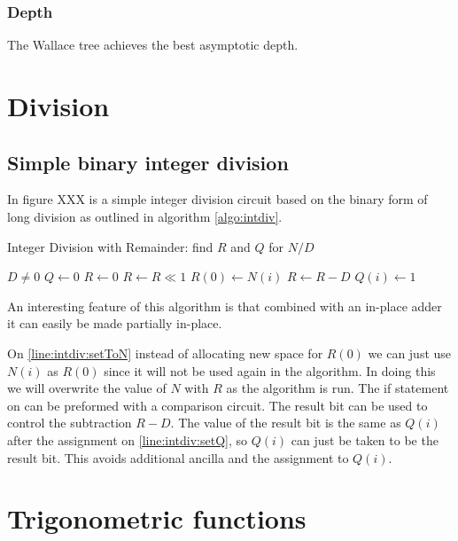     \subsubsection{Depth}
      The Wallace tree achieves the best asymptotic depth.

\section{Division}
  \subsection{Simple binary integer division}
    In figure XXX is a simple integer division circuit based on the binary form of long division as outlined in algorithm \ref{algo:intdiv}.
    \begin{program}
      \capstart
      \caption{Integer Division with Remainder: find $R$ and $Q$ for $N/D$}
      \begin{algorithmic}[1]
        \Require $D \neq 0$
        \State $Q \gets 0$              
        \State $R \gets 0$                 
          \State $R \gets R \ll 1$  
          \State $R(0) \gets N(i)$ \label{line:intdiv:setToN} 
           \label{line:intdiv:compare}
            \State $R\gets R - D$               
            \State $Q(i) \gets 1$ \label{line:intdiv:setQ}

          \EndIf
        \EndFor 
      \end{algorithmic}
      \label{algo:intdiv}
    \end{program}
    An interesting feature of this algorithm is that combined with an in-place adder\cite{CDKM:2004} it can easily be made partially in-place.

    On \cref{line:intdiv:setToN} instead of allocating new space for $R(0)$ we can just use $N(i)$ as $R(0)$ since it will not be used again in the algorithm. 
    In doing this we will overwrite the value of $N$ with $R$ as the algorithm is run.
    The if statement on  can be preformed with a comparison circuit.  
    The result bit can be used to control the subtraction $R-D$.
    The value of the result bit is the same as $Q(i)$ after the assignment on \ref{line:intdiv:setQ}, so $Q(i)$ can just be taken to be the result bit. 
    This avoids additional ancilla and the assignment to $Q(i)$.


\section{Trigonometric functions}
